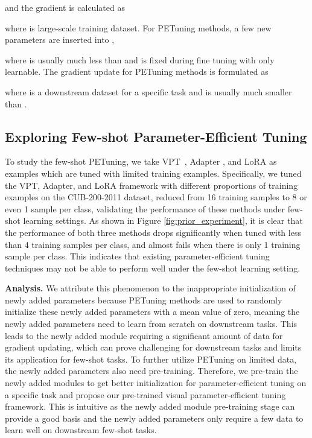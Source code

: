 \documentclass[10pt,journal,letterpaper,compsoc]{IEEEtran}
\begin{document}
\noindent and the gradient is calculated as



\noindent where  is large-scale training dataset. For PETuning methods, a few new parameters  are inserted into ,



\noindent where  is usually much less than  and  is fixed during fine tuning with only  learnable. The gradient update for PETuning methods is formulated as 



\noindent where  is a downstream dataset for a specific task and is usually much smaller than .

\subsection{Exploring Few-shot Parameter-Efficient Tuning}\label{section:sec3.2}
To study the few-shot PETuning, we take VPT~\cite{vpt}, Adapter \cite{adapter}, and LoRA \cite{Lora} as examples which are tuned with limited training examples. Specifically, we tuned the VPT, Adapter, and LoRA framework with different proportions of training examples on the CUB-200-2011 dataset, reduced from 16 training samples to 8 or even 1 sample per class, validating the performance of these methods under few-shot learning settings. As shown in Figure  \ref{fig:prior_experiment}, it is clear that the performance of both three methods drops significantly when tuned with less than 4 training samples per class, and almost fails when there is only 1 training sample per class. This indicates that existing parameter-efficient tuning techniques may not be able to perform well under the few-shot learning setting.

\textbf{Analysis.} We attribute this phenomenon to the inappropriate initialization of newly added parameters because PETuning methods are used to randomly initialize these newly added parameters with a mean value of zero, meaning the newly added parameters need to learn from scratch on downstream tasks. This leads to the newly added module requiring a significant amount of data for gradient updating, which can prove challenging for downstream tasks and limits its application for few-shot tasks. To further utilize PETuning on limited data, the newly added parameters also need pre-training. Therefore, we pre-train the newly added modules to get better initialization for parameter-efficient tuning on a specific task and propose our pre-trained visual parameter-efficient tuning framework. This is intuitive as the newly added module pre-training stage can provide a good basis and the newly added parameters only require a few data to learn well on downstream few-shot tasks.
\end{document}
